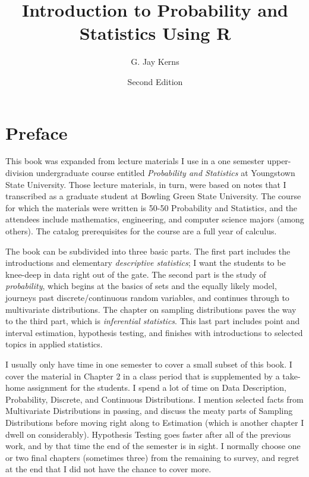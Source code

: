\documentclass[captions=tableheading]{scrbook}
\title{Introduction to Probability and Statistics Using R}
\author{G. Jay Kerns}
\date{Second Edition}
\begin{document}
\maketitle


\chapter*{Preface}

This book was expanded from lecture materials I use in a one semester upper-division undergraduate course entitled \emph{Probability and Statistics} at Youngstown State University. Those lecture materials, in turn, were based on notes that I transcribed as a graduate student at Bowling Green State University. The course for which the materials were written is 50-50 Probability and Statistics, and the attendees include mathematics, engineering, and computer science majors (among others). The catalog prerequisites for the course are a full year of calculus.

The book can be subdivided into three basic parts. The first part includes the introductions and elementary \emph{descriptive statistics}; I want the students to be knee-deep in data right out of the gate. The second part is the study of \emph{probability}, which begins at the basics of sets and the equally likely model, journeys past discrete/continuous  random variables, and continues through to multivariate distributions. The chapter on sampling distributions paves the way to the third part, which is \emph{inferential statistics}. This last part includes point and interval estimation, hypothesis testing, and finishes with introductions to selected topics in applied statistics.

I usually only have time in one semester to cover a small subset of this book. I cover the material in Chapter 2 in a class period that is supplemented by a take-home assignment for the students. I spend a lot of time on Data Description, Probability, Discrete, and Continuous Distributions. I mention selected facts from Multivariate Distributions in passing, and discuss the meaty parts of Sampling Distributions before moving right along to Estimation (which is another chapter I dwell on considerably). Hypothesis Testing goes faster after all of the previous work, and by that time the end of the semester is in sight. I normally choose one or two final chapters (sometimes three) from the remaining to survey, and regret at the end that I did not have the chance to cover more.
\end{document}
